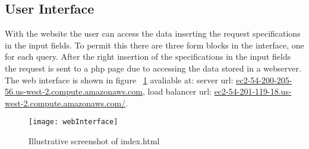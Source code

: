 \documentclass{article}
\begin{document}
\subsection{User Interface}
With the website the user can access the data inserting the request specifications in the input fields.
To permit this there are three form blocks in the interface, one for each query. 
After the right insertion of the specifications in the input fields the request is sent to a php page due to 
accessing the data stored in a webserver.
The web interface is shown in figure ~\ref{webInterface} avaliable at: server url: \url{ec2-54-200-205-56.us-west-2.compute.amazonaws.com}, 
load balancer url: \url{ec2-54-201-119-18.us-west-2.compute.amazonaws.com/}.
\begin{figure}[H]
      \centering
      \texttt{[image: webInterface]}
      \caption{Illustrative screenshot of index.html}
      \label{webInterface}
\end{figure}
\end{document}
